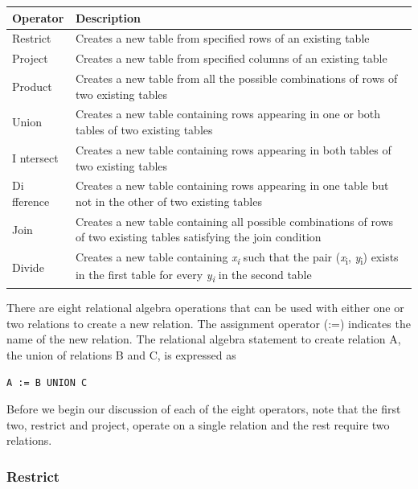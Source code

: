 \documentclass[
]{article}
\begin{document}
\begin{longtable}[]{@{}
  >{\raggedright\arraybackslash}p{}
  >{\raggedright\arraybackslash}p{}@{}}
\toprule
Operator & Description \\
\midrule
\endhead
Restrict & Creates a new table from specified rows of an existing
table \\
Project & Creates a new table from specified columns of an existing
table \\
Product & Creates a new table from all the possible combinations of
rows of two existing tables \\
Union & Creates a new table containing rows appearing in one or
both tables of two existing tables \\
I
ntersect & Creates a new table containing rows appearing in both
tables of two existing tables \\
Di
fference & Creates a new table containing rows appearing in one
table but not in the other of two existing tables \\
Join & Creates a new table containing all possible combinations
of rows of two existing tables satisfying the join
condition \\
Divide & Creates a new table containing \emph{x\textsubscript{i}} such that the pair
(\emph{x}\textsubscript{i}, \emph{y}\textsubscript{i}) exists in the first table for every
\emph{y\textsubscript{i}} in the second table \\
\bottomrule
\end{longtable}

There are eight relational algebra operations that can be used with
either one or two relations to create a new relation. The assignment
operator (:=) indicates the name of the new relation. The relational
algebra statement to create relation A, the union of relations B and C,
is expressed as

\texttt{A\ :=\ B\ UNION\ C}

Before we begin our discussion of each of the eight operators, note that
the first two, restrict and project, operate on a single relation and
the rest require two relations.

\hypertarget{restrict}{%
\subsubsection*{Restrict}\label{restrict}}
\end{document}
